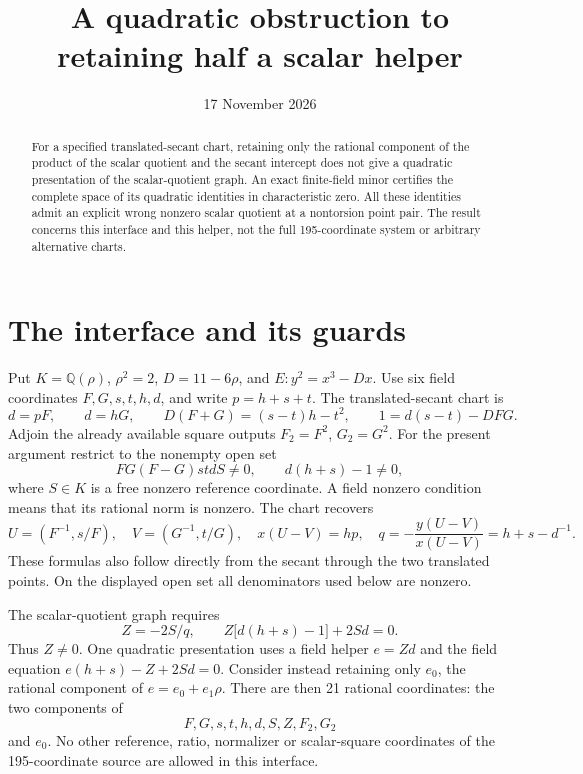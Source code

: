 \documentclass[11pt,a4paper]{article}
\title{A quadratic obstruction to retaining half a scalar helper}
\author{}\date{17 November 2026}
\newcommand{\Q}{\mathbb Q}
\begin{document}
\maketitle
\begin{abstract}
For a specified translated-secant chart, retaining only the rational
component of the product of the scalar quotient and the secant intercept
does not give a quadratic presentation of the scalar-quotient graph.
An exact finite-field minor certifies the complete space of its quadratic
identities in characteristic zero. All these identities admit an explicit
wrong nonzero scalar quotient at a nontorsion point pair. The result
concerns this interface and this helper, not the full 195-coordinate
system or arbitrary alternative charts.
\end{abstract}

\section{The interface and its guards}

Put $K=\Q(\rho)$, $\rho^2=2$, $D=11-6\rho$, and
$E:y^2=x^3-Dx$. Use six field coordinates $F,G,s,t,h,d$, and
write $p=h+s+t$. The translated-secant chart is
\begin{equation}\label{eq:chart}
 d=pF,\qquad d=hG,\qquad
 D(F+G)=(s-t)h-t^2,\qquad
 1=d(s-t)-DFG.
\end{equation}
Adjoin the already available square outputs $F_2=F^2$, $G_2=G^2$.
For the present argument restrict to the nonempty open set
\[
 FG(F-G)stdS\ne0,\qquad d(h+s)-1\ne0,
\]
where $S\in K$ is a free nonzero reference coordinate. A field
nonzero condition means that its rational norm is nonzero.
The chart recovers
\[
 U=(F^{-1},s/F),\quad V=(G^{-1},t/G),\quad
 x(U-V)=hp,\quad q=-\frac{y(U-V)}{x(U-V)}=h+s-d^{-1}.
\]
These formulas also follow directly from the secant through the two
translated points. On the displayed open set all denominators used
below are nonzero.

The scalar-quotient graph requires
\begin{equation}\label{eq:scalar}
                  Z=-2S/q,
 \qquad Z\bigl[d(h+s)-1\bigr]+2Sd=0.
\end{equation}
Thus $Z\ne0$. One quadratic presentation uses a field helper $e=Zd$
and the field equation $e(h+s)-Z+2Sd=0$. Consider instead retaining
only $e_0$, the rational component of $e=e_0+e_1\rho$.
There are then 21 rational coordinates: the two components of
\[
              F,G,s,t,h,d,S,Z,F_2,G_2
\]
and $e_0$. No other reference, ratio, normalizer or scalar-square
coordinates of the 195-coordinate source are allowed in this interface.
\end{document}
